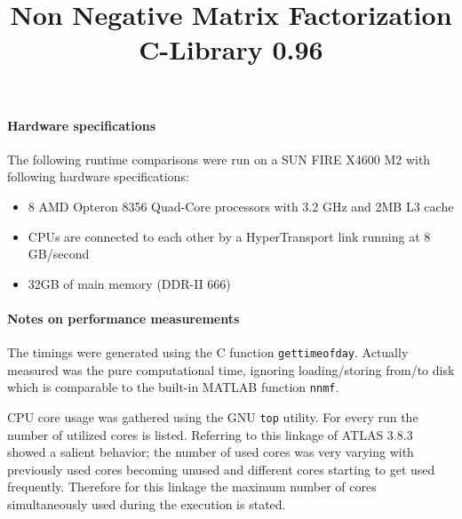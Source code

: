 \documentclass[a4paper,10pt]{scrartcl}
\title{Non Negative Matrix Factorization C-Library 0.96}
\begin{document}
\fancyhead{}


\maketitle

	\paragraph{Hardware specifications}


	The following runtime comparisons were run on a SUN FIRE X4600 M2 with following hardware specifications:
	\newline

	\begin{itemize}
	\item	8 AMD Opteron 8356 Quad-Core processors with 3.2 GHz and 2MB L3 cache
	\item	CPUs are connected to each other by a HyperTransport link running at 8 GB/second
	\item	32GB of main memory (DDR-II 666)
	\end{itemize}


	\paragraph{Notes on performance measurements}

	The timings were generated using the C function \texttt{gettimeofday}. Actually measured was the pure computational time, ignoring loading/storing from/to disk which is comparable to the built-in MATLAB function \texttt{nnmf}.


	CPU core usage was gathered using the GNU \texttt{top} utility. For every run the number of utilized cores is listed. Referring to this linkage of ATLAS 3.8.3 showed a salient behavior; the number of used cores was very varying with previously used cores becoming unused and different cores starting to get used frequently. Therefore for this linkage the maximum number of cores simultaneously used during the execution is stated.
	
	
	
\end{document}
